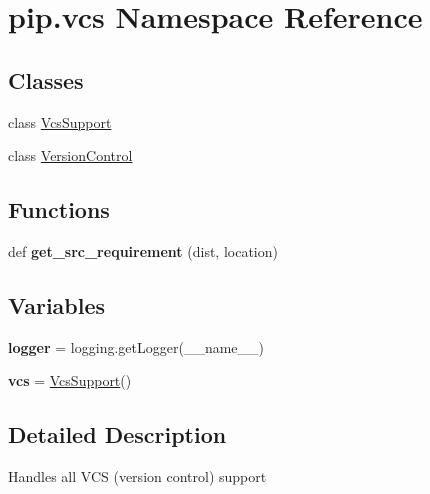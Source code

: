 \hypertarget{namespacepip_1_1vcs}{}\section{pip.\+vcs Namespace Reference}
\label{namespacepip_1_1vcs}
\subsection*{Classes}
\begin{DoxyCompactItemize}
\item 
class \hyperlink{classpip_1_1vcs_1_1_vcs_support}{Vcs\+Support}
\item 
class \hyperlink{classpip_1_1vcs_1_1_version_control}{Version\+Control}
\end{DoxyCompactItemize}
\subsection*{Functions}
\begin{DoxyCompactItemize}
\item 
\mbox{\label{namespacepip_1_1vcs_a941e9bbbc4b5d1217df18a914e5d83af}} 
def {\bfseries get\+\_\+src\+\_\+requirement} (dist, location)
\end{DoxyCompactItemize}
\subsection*{Variables}
\begin{DoxyCompactItemize}
\item 
\mbox{\label{namespacepip_1_1vcs_a6fd5bbd1830c95e9fd08c4b4818e2f78}} 
{\bfseries logger} = logging.\+get\+Logger(\+\_\+\+\_\+name\+\_\+\+\_\+)
\item 
\mbox{\label{namespacepip_1_1vcs_a9664772c6e3f60852c46644e09235d36}} 
{\bfseries vcs} = \hyperlink{classpip_1_1vcs_1_1_vcs_support}{Vcs\+Support}()
\end{DoxyCompactItemize}


\subsection{Detailed Description}
\begin{DoxyVerb}Handles all VCS (version control) support\end{DoxyVerb}
 